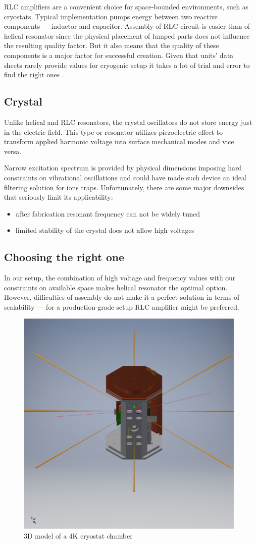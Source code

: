 RLC amplifiers are a convenient choice for space-bounded environments, such as cryostats. Typical implementation pumps energy between two reactive components --- inductor and capacitor. Assembly of RLC circuit is easier than of helical resonator since the physical placement of lumped parts does not influence the resulting quality factor. But it also means that the quality of these components is a major factor for successful creation. Given that units' data sheets rarely provide values for cryogenic setup it takes a lot of trial and error to find the right ones \cite{Gandolfi2010}.
\subsection{Crystal}
Unlike helical and RLC resonators, the crystal oscillators do not store energy just in the electric field. This type or resonator utilizes piezoelectric effect to transform applied harmonic voltage into surface mechanical modes and vice versa.

Narrow excitation spectrum is provided by physical dimensions imposing hard constraints on vibrational oscillations and could have made such device an ideal filtering solution for ions traps. Unfortunately, there are some major downsides that seriously limit its applicability:
\begin{itemize}
	\item after fabrication resonant frequency can not be widely tuned
	\item limited stability of the crystal does not allow high voltages
\end{itemize}
\subsection{Choosing the right one}
In our setup, the combination of high voltage and frequency values with our constraints on available space makes helical resonator the optimal option. However, difficulties of assembly do not make it a perfect solution in terms of scalability --- for a production-grade setup RLC amplifier might be preferred.

\begin{figure}[h]
	\includegraphics[width=\textwidth]{images/4K_chamber}
	\caption{3D model of a 4K cryostat chamber}
	\label{fig:4K_chamber}
\end{figure}